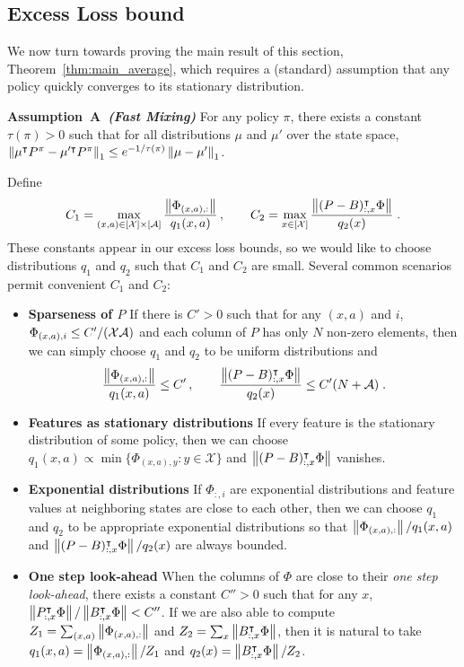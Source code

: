 \documentclass[11pt]{article}
\newcounter{assumption}%
\renewcommand{\theassumption}{A\arabic{assumption}}
\newenvironment{ass}[1][]{\begin{trivlist}\item[] \refstepcounter{assumption}%
 {\bf Assumption\ \theassumption\ {\em (#1)} } }{%
 \ifvmode\smallskip\fi\end{trivlist}}
\begin{document}
\subsection{Excess Loss bound}
We now turn towards proving the main result of this section, Theorem~\ref{thm:main_average}, which requires a (standard) assumption that any policy quickly converges to its stationary distribution.
\begin{ass}[Fast Mixing]
\label{ass:uniform-mixing}
For any policy $\pi$, there exists a constant $\tau(\pi)>0$ such that for all distributions $\mu$ and $\mu'$ over the state space, $\left\Vert\mu^\intercal P^\pi - \mu'^\intercal P^\pi\right\Vert_1 \le e^{-1/\tau(\pi)} \left\Vert\mu - \mu'\right\Vert_1$.
\end{ass}
Define
\begin{align*}
C_1 = \max_{(x,a)\in [{\cal X}]\times [{\cal A}]}\frac{\left\Vert\Phi_{(x,a),:}\right\Vert}{q_1(x, a)}\,, \qquad C_2 = \max_{x\in [{\cal X}]}\frac{\left\Vert(P - B)_{:,x}^\intercal \Phi\right\Vert}{q_2(x)} \; .
\end{align*}
These constants appear in our excess loss bounds, so we would like to choose distributions $q_1$ and $q_2$ such that $C_1$ and $C_2$ are small. Several common scenarios permit convenient $C_1$ and $C_2$:
\begin{itemize}
\item \textbf{Sparseness of $P$}
  If there is $C'>0$ such that for any $(x,a)$ and $i$, $\Phi_{(x,a), i}\le C'/({\cal X} {\cal A})$ and each column of $P$ has only $N$ non-zero elements, then we can simply choose $q_1$ and $q_2$ to be uniform distributions and  
\begin{align*}
\frac{\left\Vert\Phi_{(x,a),:}\right\Vert}{q_1(x, a)} \le C'\,, \qquad \frac{\left\Vert(P - B)_{:,x}^\intercal \Phi\right\Vert}{q_2(x)} \le C' (N + {\cal A}) \; .
\end{align*}
\item \textbf{Features as stationary distributions}
  If every feature is the stationary distribution of some policy, then we can choose 
  $q_1(x,a)\propto \min\{\Phi_{(x,a),y}: y \in \mathcal X\}$ and $\left\Vert(P - B)_{:,x}^\intercal \Phi\right\Vert$ vanishes.
\item \textbf{Exponential distributions}
  If $\Phi_{:, i}$ are exponential distributions and feature values at neighboring states are close to each other, then we can choose $q_1$ and $q_2$ to be appropriate exponential distributions so that $\left\Vert\Phi_{(x,a),:}\right\Vert/q_1(x, a)$ and $\left\Vert(P - B)_{:,x}^\intercal \Phi\right\Vert/q_2(x)$ are always bounded. 
\item \textbf{One step look-ahead}
  When the columns of $\Phi$ are close to their \textit{one step look-ahead}, there exists a constant $C''>0$ such that for any $x$, $\left\Vert P_{:,x}^\intercal \Phi\right\Vert/\left\Vert B_{:,x}^\intercal \Phi\right\Vert < C''$. If we are also able to compute $Z_1 = \sum_{(x,a)} \left\Vert\Phi_{(x,a),:}\right\Vert$ and $Z_2 = \sum_x \left\Vert B_{:,x}^\intercal \Phi\right\Vert$, then it is natural to take $q_1(x,a)= \left\Vert\Phi_{(x,a),:}\right\Vert/Z_1$ and $q_2(x)=\left\Vert B_{:,x}^\intercal \Phi\right\Vert/Z_2$.
\end{itemize}
\end{document}
